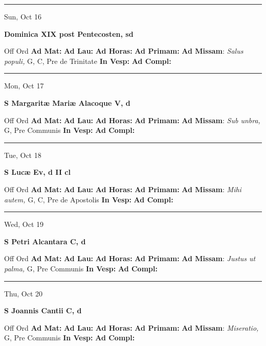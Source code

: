 \documentclass[letterpaper, 10pt]{article}
\begin{document}
\hrule
\begin{center}
Sun, Oct 16
\end{center}\textbf{ \large Dominica XIX post Pentecosten, \textnormal{\normalsize sd}}
\begin{justify}
Off Ord
\textbf{Ad Mat: }
\textbf{Ad Lau: }
\textbf{Ad Horas: }
\textbf{Ad Primam: }
\textbf{Ad Missam}: \textit{Salus populi,} G, C, Pre de Trinitate
\textbf{In Vesp: }
\textbf{Ad Compl: }\end{justify}



\hrule
\begin{center}
Mon, Oct 17
\end{center}\textbf{ \large S Margaritæ Mariæ Alacoque V, \textnormal{\normalsize d}}
\begin{justify}
Off Ord
\textbf{Ad Mat: }
\textbf{Ad Lau: }
\textbf{Ad Horas: }
\textbf{Ad Primam: }
\textbf{Ad Missam}: \textit{Sub unbra,} G, Pre Communis
\textbf{In Vesp: }
\textbf{Ad Compl: }\end{justify}



\hrule
\begin{center}
Tue, Oct 18
\end{center}\textbf{ \large S Lucæ Ev, \textnormal{\normalsize d II cl}}
\begin{justify}
Off Ord
\textbf{Ad Mat: }
\textbf{Ad Lau: }
\textbf{Ad Horas: }
\textbf{Ad Primam: }
\textbf{Ad Missam}: \textit{Mihi autem,} G, C, Pre de Apostolis
\textbf{In Vesp: }
\textbf{Ad Compl: }\end{justify}



\hrule
\begin{center}
Wed, Oct 19
\end{center}\textbf{ \large S Petri Alcantara C, \textnormal{\normalsize d}}
\begin{justify}
Off Ord
\textbf{Ad Mat: }
\textbf{Ad Lau: }
\textbf{Ad Horas: }
\textbf{Ad Primam: }
\textbf{Ad Missam}: \textit{Justus ut palma,} G, Pre Communis
\textbf{In Vesp: }
\textbf{Ad Compl: }\end{justify}



\hrule
\begin{center}
Thu, Oct 20
\end{center}\textbf{ \large S Joannis Cantii C, \textnormal{\normalsize d}}
\begin{justify}
Off Ord
\textbf{Ad Mat: }
\textbf{Ad Lau: }
\textbf{Ad Horas: }
\textbf{Ad Primam: }
\textbf{Ad Missam}: \textit{Miseratio,} G, Pre Communis
\textbf{In Vesp: }
\textbf{Ad Compl: }\end{justify}
\end{document}
